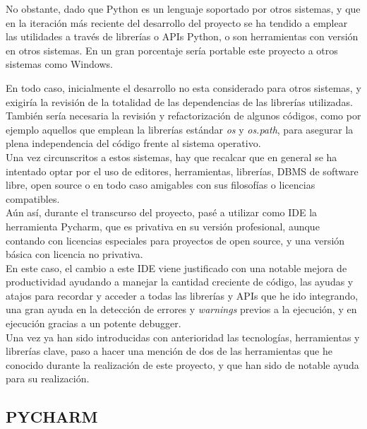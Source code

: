 No obstante, dado que Python es un lenguaje soportado por otros sistemas, y que en la iteración más reciente del desarrollo del proyecto se ha tendido a emplear las utilidades a través de librerías o APIs Python, o son herramientas con versión en otros sistemas. En un gran porcentaje sería portable este proyecto a otros sistemas como Windows.

En todo caso, inicialmente el desarrollo no esta considerado para otros sistemas, y exigiría la revisión de la totalidad de las dependencias de las librerías utilizadas. También sería necesaria la revisión y refactorización de algunos códigos, como por ejemplo  aquellos que emplean la librerías estándar \textit{os} y \textit{os.path}, para asegurar la plena independencia del código frente al sistema operativo.\\


Una vez circunscritos a estos sistemas, hay que recalcar que en general se ha intentado optar por el uso de editores, herramientas, librerías, DBMS de software libre, open source o en todo caso amigables con sus filosofías o licencias compatibles.\\


Aún así, durante el transcurso del proyecto, pasé a utilizar como IDE la herramienta Pycharm, que es privativa en su versión profesional, aunque contando con licencias especiales para proyectos de open source, y una versión básica con licencia no privativa.\\


En este caso, el cambio a este IDE viene justificado con una notable mejora de productividad ayudando a manejar la cantidad creciente de código, las ayudas y atajos para recordar y acceder a todas las librerías y APIs que he ido integrando, una gran ayuda en la detección de errores y \textit{warnings} previos a la ejecución, y en ejecución gracias a un potente debugger.\\


Una vez ya han sido introducidas con anterioridad las tecnologías, herramientas y librerías clave, paso a hacer una mención de dos de las herramientas que he conocido durante la realización de este proyecto, y que han sido de notable ayuda para su realización.\\

\subsection{PYCHARM}
\label{subsec:pycharm}

